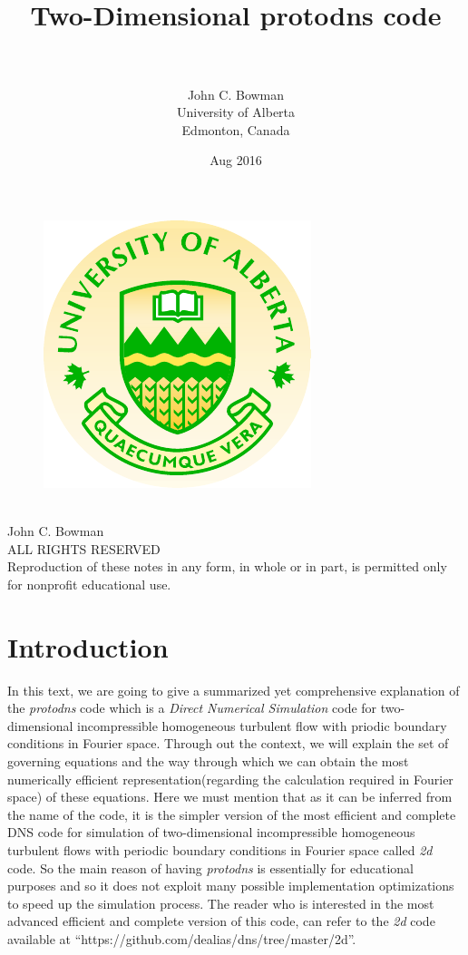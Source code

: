 \documentclass[12pt]{article}
\title{\huge{\textbf{\\Two-Dimensional protodns code}}}
\author{\\ \\John C. Bowman\\University of Alberta\\Edmonton, Canada}
\date{Aug 2016}
\begin{document}
\maketitle
\thispagestyle{empty}
\begin{figure}[h]
\centering
\includegraphics{uofa}
\end{figure}
\newpage
\thispagestyle{empty}
\begin{center}
\ \vspace{20cm}\\
John C. Bowman\\
ALL RIGHTS RESERVED\\
Reproduction of these notes in any form, in whole or in part, is permitted only for nonprofit educational use.
\end{center}
\newpage
\setcounter{page}{1}
\section{Introduction}
In this text, we are going to give a summarized yet comprehensive explanation of the \emph{protodns} code which is a \emph{Direct Numerical Simulation} code for two-dimensional incompressible homogeneous turbulent flow with priodic boundary conditions in Fourier space. Through out the context, we will explain the set of governing equations and the way through which we can obtain the most numerically efficient representation(regarding the calculation required in Fourier space) of these equations. 
Here we must mention that as it can be inferred from the name of the code, it is the simpler version of the most efficient and complete DNS code for simulation of two-dimensional incompressible homogeneous turbulent flows with periodic boundary conditions in Fourier space called \emph{2d} code. So the main reason of having \emph{protodns} is essentially for educational purposes and so it does not exploit many possible implementation optimizations to speed up the simulation process. The reader who is interested in the most advanced efficient and complete version of this code, can refer to the \emph{2d} code available at ``https://github.com/dealias/dns/tree/master/2d''.
%
\end{document}
